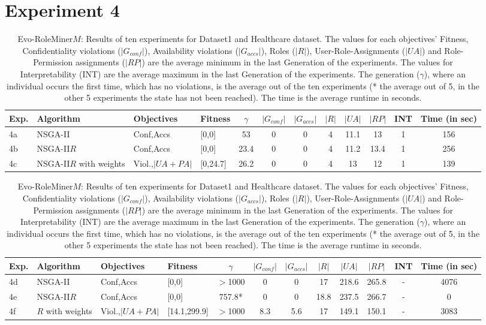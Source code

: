 \section{Experiment 4}
\label{sec:A_Exp4}
	\begin{table}[H]
		\centering
		\caption{Evo-RoleMiner$M$: Results of ten experiments for Dataset1 and Healthcare dataset. The values for each objectives' Fitness, Confidentiality violations ($|G_{conf}|$), Availability violations ($|G_{accs}|$), Roles ($|R|$), User-Role-Assignments ($|UA|$) and Role-Permission assignments ($|RP|$) are the average minimum in the last Generation of the experiments. The values for Interpretability (INT) are the average maximum in the last Generation of the experiments. The generation ($\gamma$), where an individual occurs the first time, which has no violations, is the average out of the ten experiments (* the average out of 5, in the other 5 experiments the state has not been reached). The time is the average runtime in seconds.}
		\label{tab:exp4_results}
		\begin{adjustbox}{width=\textwidth}
			\begin{tabular}{|l|l|l|l|c|c|c|c|c|c|c|c|}
				\hline
				\rowcolor{myGray} 
				\textbf{Exp.} & \textbf{Algorithm} & \textbf{Objectives} & \textbf{Fitness} & $\gamma$ & \textbf{$|G_{conf}|$} & \textbf{$|G_{accs}|$} & \textbf{$|R|$} & \textbf{$|UA|$} & \textbf{$|RP|$} & \textbf{INT} & \textbf{Time (in sec)}\\ \hline
				4a & NSGA-II & Conf,Accs &  [0,0] &  53 & 0   &   0 & 4   &   11.1   &   13   &   1    & 156\\ \hline
				4b & NSGA-II$R$ & Conf,Accs &   [0,0] &   23.4 &0   &   0 & 4   &   11.2   &   13.4   &   1    & 256\\ \hline
				4c & NSGA-II$R$ with weights & Viol.,$|UA+PA|$ &   [0,24.7] &   26.2 &   0 & 0 &4   &   13   &   12   &   1    & 139\\ \hline			
			\end{tabular}
		\end{adjustbox}
		\begin{adjustbox}{width=\textwidth}
			\begin{tabular}{|l|l|l|l|c|c|c|c|c|c|c|c|}
				\hline
				\rowcolor{myGray} 
				\textbf{Exp.} & \textbf{Algorithm} & \textbf{Objectives} & \textbf{Fitness} & $\gamma$ & \textbf{$|G_{conf}|$} & \textbf{$|G_{accs}|$} & \textbf{$|R|$} & \textbf{$|UA|$} & \textbf{$|RP|$} & \textbf{INT} & \textbf{Time (in sec)}\\ \hline
				4d & NSGA-II & Conf,Accs &   [0,0] &   $>$1000 &0   &   0 & 17   &   218.6   &   265.8   &   -    & 4076\\ \hline
				4e & NSGA-II$R$ & Conf,Accs   & [0,0] &   757.8* &   0   &   0 & 18.8   &   237.5   &   266.7   &   -    & 0\\ \hline
				4f & $R$ with weights & Viol.,$|UA+PA|$ & [14.1,299.9] &   $>$1000 &   8.3   &   5.6 & 17   &   149.1   &   150.1   &   -    & 3083\\ \hline		
			\end{tabular}
		\end{adjustbox}
	\end{table}

